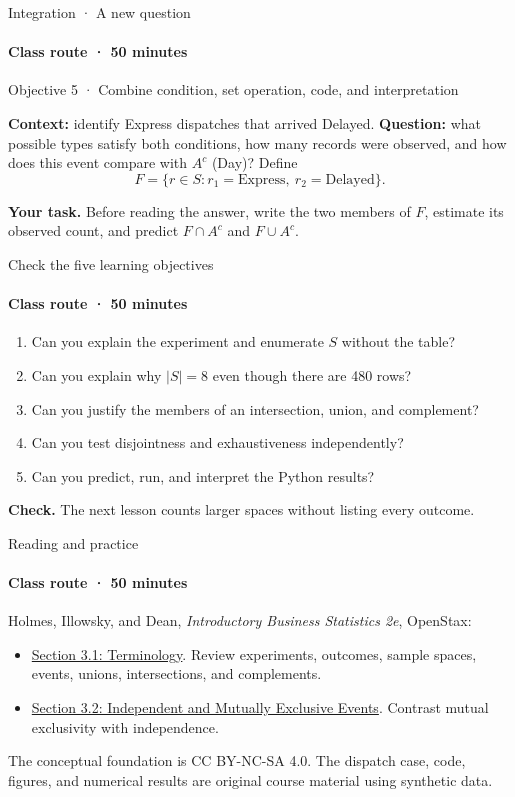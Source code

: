 \documentclass[aspectratio=169,11pt,english]{beamer}
\newcommand{\objetivo}[1]{{\small\color{TecAzul}#1\par}\medskip}
\newcommand{\question}[1]{\par\smallskip\textbf{Your task.} #1\par}
\newcommand{\checkit}[1]{\par\smallskip\textbf{Check.} #1\par}
\begin{document}
\begin{frame}{Integration · A new question}
  \framesubtitle{Class route · 50 minutes}
  \objetivo{Objective 5 · Combine condition, set operation, code, and interpretation}
  \textbf{Context:} identify Express dispatches that arrived Delayed.
  \textbf{Question:} what possible types satisfy both conditions, how many records
  were observed, and how does this event compare with $A^c$ (Day)?
  Define
  \[
    F=\{r\in S:r_1=\text{Express},\ r_2=\text{Delayed}\}.
  \]
  \question{Before reading the answer, write the two members of $F$, estimate its
  observed count, and predict $F\cap A^c$ and $F\cup A^c$.}
\end{frame}



\begin{frame}{Check the five learning objectives}
  \framesubtitle{Class route · 50 minutes}
  \begin{enumerate}
    \item Can you explain the experiment and enumerate $S$ without the table?
    \item Can you explain why $|S|=8$ even though there are 480 rows?
    \item Can you justify the members of an intersection, union, and complement?
    \item Can you test disjointness and exhaustiveness independently?
    \item Can you predict, run, and interpret the Python results?
  \end{enumerate}
  \checkit{The next lesson counts larger spaces without listing every outcome.}
\end{frame}

\begin{frame}{Reading and practice}
  \framesubtitle{Class route · 50 minutes}
  Holmes, Illowsky, and Dean, \emph{Introductory Business Statistics 2e}, OpenStax:
  \begin{itemize}
    \item \href{https://openstax.org/books/introductory-business-statistics-2e/pages/3-1-terminology}{Section 3.1: Terminology}. Review experiments, outcomes, sample spaces, events, unions, intersections, and complements.
    \item \href{https://openstax.org/books/introductory-business-statistics-2e/pages/3-2-independent-and-mutually-exclusive-events}{Section 3.2: Independent and Mutually Exclusive Events}. Contrast mutual exclusivity with independence.
  \end{itemize}
  The conceptual foundation is CC BY-NC-SA 4.0. The dispatch case, code,
  figures, and numerical results are original course material using synthetic data.
\end{frame}
\end{document}

